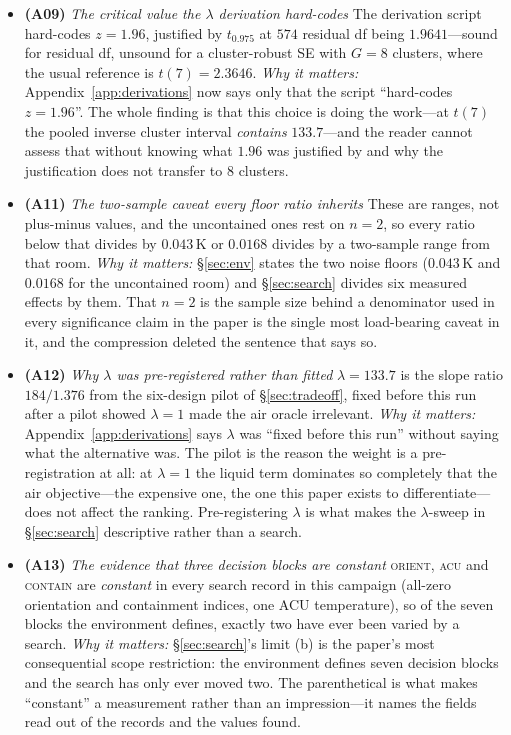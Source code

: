 \documentclass{article}
\begin{document}
\begin{itemize}
\item \textbf{(A09)} \emph{The critical value the $\lambda$ derivation hard-codes}  The derivation script hard-codes $z = 1.96$, justified by $t_{0.975}$ at $574$ residual df being $1.9641$---sound for residual df, unsound for a cluster-robust SE with $G = 8$ clusters, where the usual reference is $t(7) = 2.3646$.  \emph{Why it matters:} Appendix~\ref{app:derivations} now says only that the script ``hard-codes $z = 1.96$''.  The whole finding is that this choice is doing the work---at $t(7)$ the pooled inverse cluster interval \emph{contains} $133.7$---and the reader cannot assess that without knowing what $1.96$ was justified by and why the justification does not transfer to $8$ clusters.
\item \textbf{(A11)} \emph{The two-sample caveat every floor ratio inherits}  These are ranges, not plus-minus values, and the uncontained ones rest on $n = 2$, so every ratio below that divides by $0.043$\,K or $0.0168$ divides by a two-sample range from that room.  \emph{Why it matters:} \S\ref{sec:env} states the two noise floors ($0.043$\,K and $0.0168$ for the uncontained room) and \S\ref{sec:search} divides six measured effects by them.  That $n = 2$ is the sample size behind a denominator used in every significance claim in the paper is the single most load-bearing caveat in it, and the compression deleted the sentence that says so.
\item \textbf{(A12)} \emph{Why $\lambda$ was pre-registered rather than fitted}  $\lambda = 133.7$ is the slope ratio $184/1.376$ from the six-design pilot of \S\ref{sec:tradeoff}, fixed before this run after a pilot showed $\lambda = 1$ made the air oracle irrelevant.  \emph{Why it matters:} Appendix~\ref{app:derivations} says $\lambda$ was ``fixed before this run'' without saying what the alternative was.  The pilot is the reason the weight is a pre-registration at all: at $\lambda = 1$ the liquid term dominates so completely that the air objective---the expensive one, the one this paper exists to differentiate---does not affect the ranking.  Pre-registering $\lambda$ is what makes the $\lambda$-sweep in \S\ref{sec:search} descriptive rather than a search.
\item \textbf{(A13)} \emph{The evidence that three decision blocks are constant}  \textsc{orient}, \textsc{acu} and \textsc{contain} are \emph{constant} in every search record in this campaign (all-zero orientation and containment indices, one ACU temperature), so of the seven blocks the environment defines, exactly two have ever been varied by a search.  \emph{Why it matters:} \S\ref{sec:search}'s limit (b) is the paper's most consequential scope restriction: the environment defines seven decision blocks and the search has only ever moved two.  The parenthetical is what makes ``constant'' a measurement rather than an impression---it names the fields read out of the records and the values found.

\end{itemize}
\end{document}

